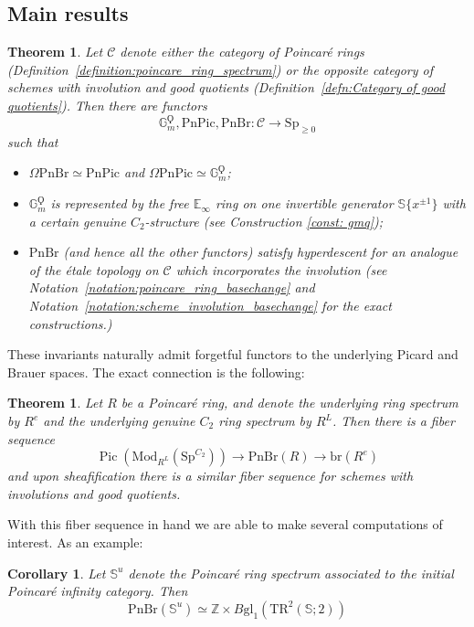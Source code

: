 \documentclass{article}
\DeclareMathOperator{\Pic}{Pic} %
\newcommand{\ZZ}{\mathbb{Z}}
\newcommand{\pnpic}{\ensuremath{\mathrm{PnPic}}}
\newcommand{\pnbr}{\ensuremath{\mathrm{PnBr}}}
\newtheorem{theorem}[equation]{Theorem}
\newtheorem{corollary}[equation]{Corollary}
\theoremstyle{definition}
\begin{document}
\subsection{Main results}
\begin{theorem}
    Let $\mathcal{C}$ denote either the category of Poincar{\'e} rings (Definition~\ref{definition:poincare_ring_spectrum}) or the opposite category of schemes with involution and good quotients (Definition~\ref{defn:Category of good quotients}). Then there are functors \[\mathbb{G}_m^\Qoppa, \pnpic, \pnbr:\mathcal{C}\to \mathrm{Sp}_{\geq 0}\] such that 
    \begin{itemize}
        \item $\Omega \pnbr\simeq \pnpic$ and $\Omega \pnpic\simeq \mathbb{G}_m^\Qoppa$;
        \item $\mathbb{G}_m^\Qoppa$ is represented by the free $\mathbb{E}_\infty$ ring on one invertible generator $\mathbb{S}\{x^{\pm 1}\}$ with a certain genuine $C_2$-structure (see Construction \ref{const: gmq});
        \item $\pnbr$ (and hence all the other functors) satisfy hyperdescent for an analogue of the {\'e}tale topology on $\mathcal{C}$ which incorporates the involution (see Notation~\ref{notation:poincare_ring_basechange} and Notation~\ref{notation:scheme_involution_basechange} for the exact constructions.) 
    \end{itemize}
\end{theorem}

These invariants naturally admit forgetful functors to the underlying Picard and Brauer spaces. The exact connection is the following:

\begin{theorem}
    Let $R$ be a Poincar{\'e} ring, and denote the underlying ring spectrum by $R^e$ and the underlying genuine $C_2$ ring spectrum by $R^L$. Then there is a fiber sequence \[\Pic(\mathrm{Mod}_{R^L}(\mathrm{Sp}^{C_2}))\to \pnbr(R)\to \mathrm{br}(R^e)\] and upon sheafification there is a similar fiber sequence for schemes with involutions and good quotients.
\end{theorem}

With this fiber sequence in hand we are able to make several computations of interest. As an example:

\begin{corollary}
    Let $\mathbb{S}^u$ denote the Poincar{\'e} ring spectrum associated to the initial Poincar{\'e} infinity category. Then \[\pnbr(\mathbb{S}^u)\simeq \ZZ\times B\mathrm{gl}_1(\mathrm{TR}^2(\mathbb{S};2))\]
\end{corollary}
\end{document}
